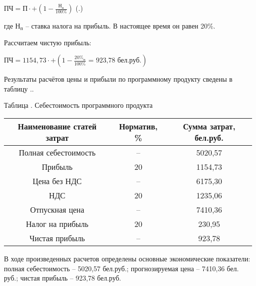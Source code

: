 {	\formulaspace \par \redline 
		$\textrm{ПЧ} = \textrm{П} \cdot + (\textrm{1} - \frac{\textrm{Н}_{\textrm{п}}}{\textrm{100\%}})$
	\hfill (\thechaptercntr .\theformulacntr) \redline
	\formulaspace \addtocounter{formulacntr}{1}

	\par \redline где $\textrm{Н}_{\textrm{п}}$ {--} ставка налога на прибыль. В настоящее время он равен 20\%.

	\par \redline Рассчитаем чистую прибыль:
	
	\formulaspace \par \redline 
		$\textrm{ПЧ} = 1154,73 \cdot + (\textrm{1} - \frac{\textrm{20\%}_{\textrm{п}}}{\textrm{100\%}} \textrm{ = 923,78 {бел.руб.}})$
	\formulaspace

	\par \redline Результаты расчётов цены и прибыли по программному продукту сведены в таблицу \thechaptercntr .\thetablecntr.

	\formulaspace
	\begin{flushleft}
		\par \centering Таблица \thechaptercntr .\thetablecntr \spc {--} Себестоимость программного продукта
	\end{flushleft}
	{\begin{Center}
	\begin{tabular}{|c|c|c|}
		\hline
		Наименование статей затрат & Норматив, \% & Сумма затрат, бел.руб. \\ \hline
		Полная себестоимость & {--} & 5020,57 \\ \hline
		Прибыль & 20 & 1154,73 \\ \hline
		Цена без НДС & {--} & 6175,30 \\ \hline
		НДС & 20 & 1235,06 \\ \hline
		Отпускная цена & {--} & 7410,36 \\ \hline
		Налог на прибыль & 20 & 230,95 \\ \hline
		Чистая прибыль & {--} & 923,78 \\ \hline
	\end{tabular} \addtocounter{tablecntr}{1}
	\end{Center}}
	\formulaspace

	\par \redline В ходе произведенных расчетов определены основные экономические показатели: полная себестоимость – 5020,57 бел.руб.; прогнозируемая цена – 7410,36 бел. руб.; чистая прибыль – 923,78 бел.руб. 

}
